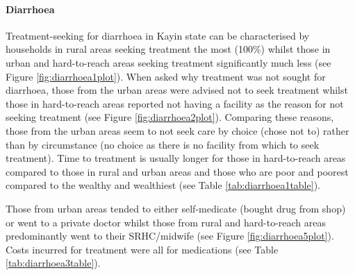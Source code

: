\documentclass[12pt,a4paper]{article}
\let\oldparagraph\paragraph
\renewcommand{\paragraph}[1]{\oldparagraph{#1}\mbox{}}
\begin{document}
\hypertarget{diarrhoea}{%
\paragraph{Diarrhoea}\label{diarrhoea}}

Treatment-seeking for diarrhoea in Kayin state can be characterised by households in rural areas seeking treatment the most (100\%) whilst those in urban and hard-to-reach areas seeking treatment significantly much less (see Figure \ref{fig:diarrhoea1plot}). When asked why treatment was not sought for diarrhoea, those from the urban areas were advised not to seek treatment whilst those in hard-to-reach areas reported not having a facility as the reason for not seeking treatment (see Figure \ref{fig:diarrhoea2plot}). Comparing these reasons, those from the urban areas seem to not seek care by choice (chose not to) rather than by circumstance (no choice as there is no facility from which to seek treatment). Time to treatment is usually longer for those in hard-to-reach areas compared to those in rural and urban areas and those who are poor and poorest compared to the wealthy and wealthiest (see Table \ref{tab:diarrhoea1table}).

Those from urban areas tended to either self-medicate (bought drug from shop) or went to a private doctor whilst those from rural and hard-to-reach areas predominantly went to their SRHC/midwife (see Figure \ref{fig:diarrhoea5plot}). Costs incurred for treatment were all for medications (see Table \ref{tab:diarrhoea3table}).
\end{document}
